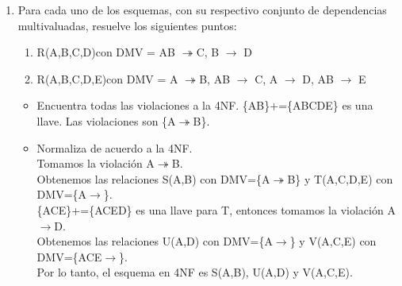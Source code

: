 \documentclass[a4paper, 12pt]{report}
\begin{document}
\begin{enumerate}
\item Para  cada  uno  de  los  esquemas,  con  su  respectivo  conjunto  de  dependencias  multivaluadas, resuelve los siguientes puntos:\\
\begin{enumerate}
	\item R(A,B,C,D)con DMV = {AB $\twoheadrightarrow$C, B $\rightarrow$ D}
	\item R(A,B,C,D,E)con DMV = { A $\twoheadrightarrow$B, AB $\rightarrow$ C, A $\rightarrow$ D, AB $\rightarrow$ E}\\
\end{enumerate}
\begin{itemize}
	\item Encuentra todas las violaciones a la 4NF.
	\{AB\}+=\{ABCDE\} es una llave. Las violaciones son \{A$\twoheadrightarrow$B\}.\\
	\item Normaliza de acuerdo a la 4NF.\\
	Tomamos la violación A$\twoheadrightarrow$B.\\
	Obtenemos las relaciones S(A,B) con DMV=\{A$\twoheadrightarrow$B\} y
	T(A,C,D,E) con DMV=\{A$\rightarrow$\}.\\
	\{ACE\}+=\{ACED\} es una llave para T, entonces tomamos la violación
	A$\rightarrow$D.\\
	Obtenemos las relaciones U(A,D) con DMV=\{A$\rightarrow$\} y V(A,C,E) con
	DMV=\{ACE$\rightarrow$\}.\\
	Por lo tanto, el esquema en 4NF es S(A,B), U(A,D) y V(A,C,E).
\end{itemize}
\end{enumerate}
\end{document}
